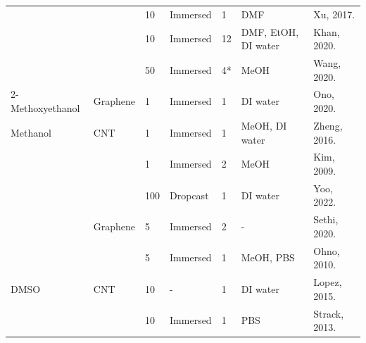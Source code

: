 \documentclass[
  a4paper,
]{scrbook}
\begin{document}
\begin{longtable}[]{@{}lllllll@{}}
& & 10 & Immersed & 1 & DMF & Xu, 2017. \cite{Xu2017} \\
& & 10 & Immersed & 12 & DMF, EtOH, DI water & Khan, 2020.
\cite{Khan2020} \\
& & 50 & Immersed & 4* & MeOH & Wang, 2020. \cite{Wang2020} \\
2-Methoxyethanol & Graphene & 1 & Immersed & 1 & DI water & Ono, 2020.
\cite{Ono2020} \\
Methanol & CNT & 1 & Immersed & 1 & MeOH, DI water & Zheng, 2016.
\cite{Zheng2016} \\
& & 1 & Immersed & 2 & MeOH & Kim, 2009. \cite{Kim2009} \\
& & 100 & Dropcast & 1 & DI water & Yoo, 2022. \cite{Yoo2022} \\
& Graphene & 5 & Immersed & 2 & - & Sethi, 2020. \cite{Sethi2020} \\
& & 5 & Immersed & 1 & MeOH, PBS & Ohno, 2010. \cite{Ohno2010} \\
DMSO & CNT & 10 & - & 1 & DI water & Lopez, 2015. \cite{Lopez2015} \\
& & 10 & Immersed & 1 & PBS & Strack, 2013. \cite{Strack2013} \\
\end{longtable}

\newpage
{}
\end{document}

